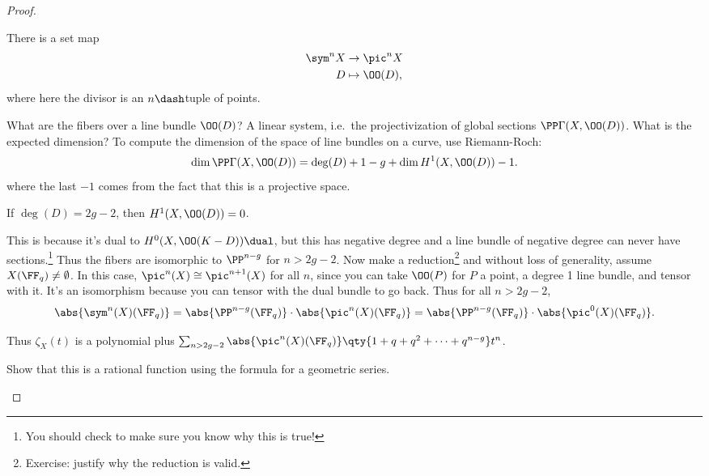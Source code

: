 \begin{proof}

\begin{claim}

There is a set map
\begin{align*}  
\sym^n X &\to \pic^n X \\
D &\mapsto \OO(D)
,\end{align*} where here the divisor is an \(n\dash\)tuple of points.

\end{claim}

What are the fibers over a line bundle \(\OO(D)\)? A linear system,
i.e.~the projectivization of global sections \(\PP \Gamma(X, \OO(D))\).
What is the expected dimension? To compute the dimension of the space of
line bundles on a curve, use Riemann-Roch:
\begin{align*}  
\dim \PP\Gamma(X, \OO(D)) = \deg(D) + 1 - g + \dim H^1(X, \OO(D)) - 1
.\end{align*} where the last \(-1\) comes from the fact that this is a
projective space.

\begin{claim}

If \(\deg(D) = 2g-2\), then \(H^1(X, \OO(D)) = 0\).

\end{claim}

This is because it's dual to \(H^0(X, \OO(K-D))\dual\), but this has
negative degree and a line bundle of negative degree can never have
sections.\footnote{You should check to make sure you know why this is
  true!} Thus the fibers are isomorphic to \(\PP^{n-g}\) for \(n>2g-2\).
Now make a reduction\footnote{Exercise: justify why the reduction is
  valid.} and without loss of generality, assume
\(X(\FF_q) \neq \emptyset\). In this case,
\(\pic^n(X) \cong \pic^{n+1}(X)\) for all \(n\), since you can take
\(\OO(P)\) for \(P\) a point, a degree 1 line bundle, and tensor with
it. It's an isomorphism because you can tensor with the dual bundle to
go back. Thus for all \(n>2g-2\),
\begin{align*}  
\abs{\sym^n(X)(\FF_q)} 
= \abs{\PP^{n-g}(\FF_q)} \cdot \abs{\pic^n(X)(\FF_q)}
= \abs{\PP^{n-g}(\FF_q)} \cdot \abs{\pic^0(X)(\FF_q)}
.\end{align*}

Thus \(\zeta_X(t)\) is a polynomial plus
\(\sum_{n>2g-2} \abs{\pic^n(X)(\FF_q)}\qty{1+q+q^2+\cdots+q^{n-g}}t^n\).

\begin{exercise}

Show that this is a rational function using the formula for a geometric
series.

\end{exercise}

\end{proof}

